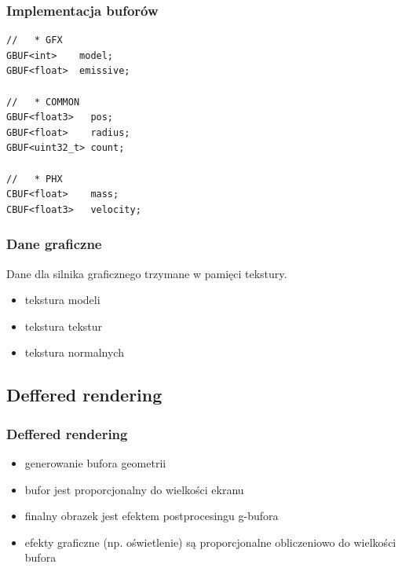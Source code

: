 \documentclass{beamer}
\begin{document}
\begin{frame}[fragile]
	\frametitle{Implementacja buforów}
	\begin{verbatim}
//   * GFX
GBUF<int>    model;
GBUF<float>  emissive;

//   * COMMON
GBUF<float3>   pos;
GBUF<float>    radius;
GBUF<uint32_t> count;

//   * PHX
CBUF<float>    mass;
CBUF<float3>   velocity;
	\end{verbatim}
\end{frame}

\frame
{
	\frametitle{Dane graficzne}

	Dane dla silnika graficznego trzymane w pamięci tekstury.
	\begin{itemize}
	\item tekstura modeli
	\item tekstura tekstur
	\item tekstura normalnych
	\end{itemize}
}

\subsection{Deffered rendering}\label{sub:deffered rendering}

\frame
{
	\frametitle{Deffered rendering}

	\begin{itemize}
	\item generowanie bufora geometrii
	\item bufor jest proporcjonalny do wielkości ekranu
	\item finalny obrazek jest efektem postprocesingu g-bufora
	\item efekty graficzne (np. oświetlenie) są proporcjonalne obliczeniowo do wielkości bufora
	\end{itemize}
}
\end{document}
